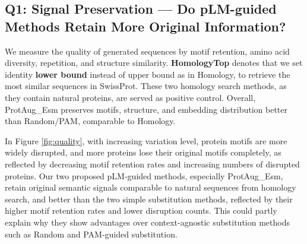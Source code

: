 \documentclass{article}
\begin{document}

\subsection{Q1: Signal Preservation — Do pLM-guided Methods Retain More Original Information?}

We measure the quality of generated sequences by motif retention, amino acid diversity, repetition, and structure similarity. \textbf{HomologyTop} denotes that we set identity \textbf{lower bound} instead of upper bound as in Homology, to retrieve the most similar sequences in SwissProt. These two homology search methods, as they contain natural proteins, are served as positive control. Overall, ProtAug\_Esm preserves motifs, structure, and embedding distribution better than Random/PAM, comparable to Homology.

In Figure \ref{fig:quality}, with increasing variation level, protein motifs are more widely disrupted, and more proteins lose their original motifs completely, as reflected by decreasing motif retention rates and increasing numbers of disrupted proteins. Our two proposed pLM-guided methods, especially ProtAug\_Esm, retain original semantic signals comparable to natural sequences from homology search, and better than the two simple substitution methods, reflected by their higher motif retention rates and lower disruption counts. This could partly explain why they show advantages over context-agnostic substitution methods such as Random and PAM-guided substitution.
\end{document}
